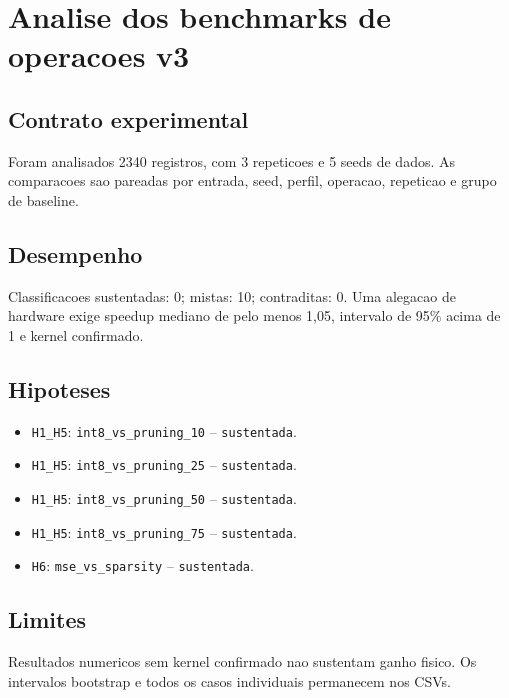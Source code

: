 \chapter{Analise dos benchmarks de operacoes v3}
\section{Contrato experimental}
Foram analisados 2340 registros, com 3 repeticoes e 5 seeds de dados.
As comparacoes sao pareadas por entrada, seed, perfil, operacao, repeticao e grupo de baseline.
\section{Desempenho}
Classificacoes sustentadas: 0; mistas: 10; contraditas: 0.
Uma alegacao de hardware exige speedup mediano de pelo menos 1,05, intervalo de 95\% acima de 1 e kernel confirmado.
\section{Hipoteses}
\begin{itemize}
\item \texttt{H1\_H5}: \texttt{int8\_vs\_pruning\_10} -- \texttt{sustentada}.
\item \texttt{H1\_H5}: \texttt{int8\_vs\_pruning\_25} -- \texttt{sustentada}.
\item \texttt{H1\_H5}: \texttt{int8\_vs\_pruning\_50} -- \texttt{sustentada}.
\item \texttt{H1\_H5}: \texttt{int8\_vs\_pruning\_75} -- \texttt{sustentada}.
\item \texttt{H6}: \texttt{mse\_vs\_sparsity} -- \texttt{sustentada}.
\end{itemize}
\section{Limites}
Resultados numericos sem kernel confirmado nao sustentam ganho fisico. Os intervalos bootstrap e todos os casos individuais permanecem nos CSVs.
